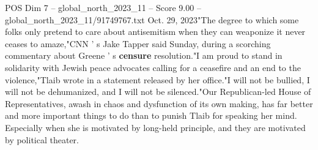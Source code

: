 \begin{textsample}{POS Dim 7 – global\_north\_2023\_11 – Score 9.00 – global\_north\_2023\_11/91749767.txt}
Oct. 29, 2023"The degree to which some folks only pretend to care about antisemitism when they can weaponize it never ceases to amaze,"CNN ' s Jake Tapper said Sunday, during a scorching commentary about Greene ' s \textbf{censure} resolution."I am proud to stand in solidarity with Jewish peace advocates calling for a ceasefire and an end to the violence,"Tlaib wrote in a statement released by her office."I will not be bullied, I will not be dehumanized, and I will not be silenced."Our Republican-led House of Representatives, awash in chaos and dysfunction of its own making, has far better and more important things to do than to punish Tlaib for speaking her mind.
Especially when she is motivated by long-held principle, and they are motivated by political theater.

\end{textsample}
